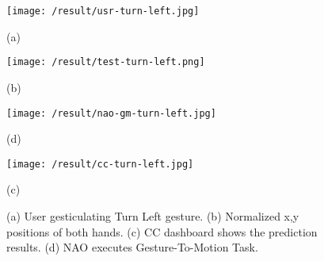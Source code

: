 \begin{figure}
	[h] 
	\begin{minipage}
		{0.3 
		\textwidth} 
		\texttt{[image: /result/usr-turn-left.jpg]} \caption*{(a)} 
	\end{minipage}
	\begin{minipage}
		{0.7
			\textwidth} 
		\texttt{[image: /result/test-turn-left.png]} \caption*{(b)} 
	\end{minipage}
	\begin{minipage}
		{0.3
		\textwidth}
		\texttt{[image: /result/nao-gm-turn-left.jpg]} \caption*{(d)} 
	\end{minipage}
	\begin{minipage}
		{0.7
			\textwidth}
		\texttt{[image: /result/cc-turn-left.jpg]}	\caption*{(c)} 
	\end{minipage}
	\caption{(a) User gesticulating Turn Left gesture. (b) Normalized x,y positions of both hands. (c) CC dashboard shows the prediction results. (d) NAO executes Gesture-To-Motion Task.} \label{res:gm:turn-left} 
\end{figure}